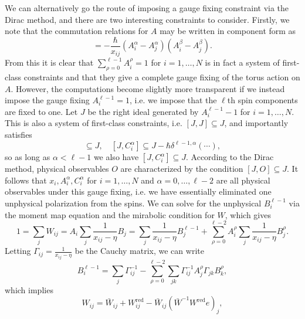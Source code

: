 We can alternatively go the route of imposing a gauge fixing constraint via the Dirac method, and there are two interesting constraints to consider. Firstly, we note that the commutation relations for $A$ may be written in component form as
\begin{equation}
[A_i^\alpha,A_j^\beta] = -\frac{\hbar}{x_{ij}} (A_i^\alpha-A_j^\alpha) (A_i^\beta-A_j^\beta).
\end{equation}
From this it is clear that $\sum_{\rho=0}^{\ell-1} A_i^\rho = 1$ for $i=1,\dots,N$ is in fact a system of first-class constraints and that they give a complete gauge fixing of the torus action on $A$. However, the computations become slightly more transparent if we instead impose the gauge fixing $A_i^{\ell-1} = 1$, i.e. we impose that the $\ell$th spin components are fixed to one. \todo{[TODO: Chapters 1 and 4 instead fix $a^0 = 1$; consider fixing $A_i^0 = 1$ here and adapting $\mathfrak{m}_\ell$ accordingly.]}  Let $J$ be the right ideal generated by $A_i^{\ell-1} - 1$ for $i=1,\dots,N$. This is also a 
system of first-class constraints, i.e. $[J,J] \subseteq J$, and importantly satisfies
\begin{equation}
[J,A_i^\alpha] \subseteq J, \quad [J,C_i^\alpha] \subseteq J - \hbar\delta^{\ell-1,\alpha} ({\cdots}),
\end{equation}
so as long as $\alpha < \ell-1$ we also have $[J,C_i^\alpha] \subseteq J$. According to the Dirac method, physical observables $O$ are characterized by the condition $[J,O] \subseteq J$. It follows that $x_i,A_i^\alpha,C_i^\alpha$ for $i=1,\dots,N$ and $\alpha = 0,\dots,\ell-2$ are all physical observables under this gauge fixing, i.e. we have essentially eliminated one unphysical polarization from the spins. We can solve for the unphysical $B_i^{\ell-1}$ via the moment map equation and the mirabolic condition for $W$, which gives
\begin{equation}
1 = \sum_j W_{ij} = A_i \sum_j \frac{1}{x_{ij}-\eta} B_j = \sum_j \frac{1}{x_{ij}-\eta} B_j^{\ell-1} + \sum_{\rho=0}^{\ell-2} A_i^\rho \sum_j \frac{1}{x_{ij}-\eta} B_j^\rho.
\end{equation}
Letting $\Gamma_{ij} = \frac{1}{x_{ij}-\eta}$ be the Cauchy matrix, we can write
\begin{equation}
B_i^{\ell-1} = \sum_j \Gamma_{ij}^{-1} - \sum_{\rho=0}^{\ell-2} \sum_{jk} \Gamma_{ij}^{-1} A_j^\rho \Gamma_{jk} B_k^\rho,
\end{equation}
which implies
\begin{equation}
W_{ij} = \bar W_{ij} + W_{ij}^\text{red} - \bar W_{ij} (\bar W^{-1} W^\text{red} e)_j,
\end{equation}
